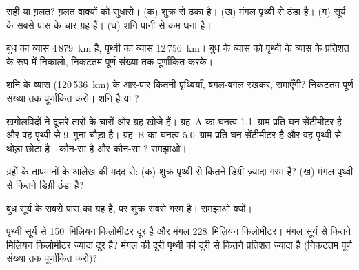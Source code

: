 \begin{exercise}[$\star$]\label{exo:g6:earth-a-planet:4}
सही या ग़लत? ग़लत वाक्यों को सुधारो।
(क) शुक्र  से ढका है।
(ख) मंगल पृथ्वी से ठंडा है।
(ग)  सूर्य के सबसे पास के चार ग्रह हैं।
(घ) शनि पानी से कम घना है।
\end{exercise}

\begin{exercise}[$\star\star$]\label{exo:g6:earth-a-planet:5}
बुध का व्यास 4\,879~km है, पृथ्वी का व्यास
12\,756~km। बुध के व्यास को पृथ्वी के व्यास के प्रतिशत के रूप में निकालो,
निकटतम पूर्ण संख्या तक पूर्णांकित करके।
\end{exercise}

\begin{exercise}[$\star\star$]\label{exo:g6:earth-a-planet:6}
शनि के व्यास (120\,536~km) के आर-पार कितनी पृथ्वियाँ, बगल-बगल रखकर, समाएँगी?
निकटतम पूर्ण संख्या तक पूर्णांकित करो। शनि  है
या ?
\end{exercise}

\begin{exercise}[$\star\star$]\label{exo:g6:earth-a-planet:7}
खगोलविदों ने दूसरे तारों के चारों ओर ग्रह खोजे हैं। ग्रह~A का घनत्व 1.1~ग्राम
प्रति घन सेंटीमीटर है और वह पृथ्वी से 9~गुना चौड़ा है।
ग्रह~B का घनत्व 5.0~ग्राम प्रति घन सेंटीमीटर है और वह पृथ्वी से थोड़ा
छोटा है। कौन-सा  है और कौन-सा ? समझाओ।
\end{exercise}

\begin{exercise}[$\star\star$]\label{exo:g6:earth-a-planet:8}
ग्रहों के तापमानों के आलेख की मदद से: (क) शुक्र पृथ्वी से कितने डिग्री
ज़्यादा गरम है? (ख) मंगल पृथ्वी से कितने डिग्री
ठंडा है?
\end{exercise}

\begin{exercise}[$\star\star$]\label{exo:g6:earth-a-planet:9}
बुध सूर्य के सबसे पास का ग्रह है, पर शुक्र सबसे गरम है। समझाओ
क्यों।
\end{exercise}

\begin{exercise}[$\star\star$]\label{exo:g6:earth-a-planet:10}
पृथ्वी सूर्य से 150~मिलियन किलोमीटर दूर है और मंगल 228~मिलियन
किलोमीटर। मंगल सूर्य से कितने मिलियन किलोमीटर ज़्यादा दूर है? मंगल की दूरी पृथ्वी
की दूरी से कितने प्रतिशत ज़्यादा है (निकटतम पूर्ण संख्या तक
पूर्णांकित करो)?
\end{exercise}

